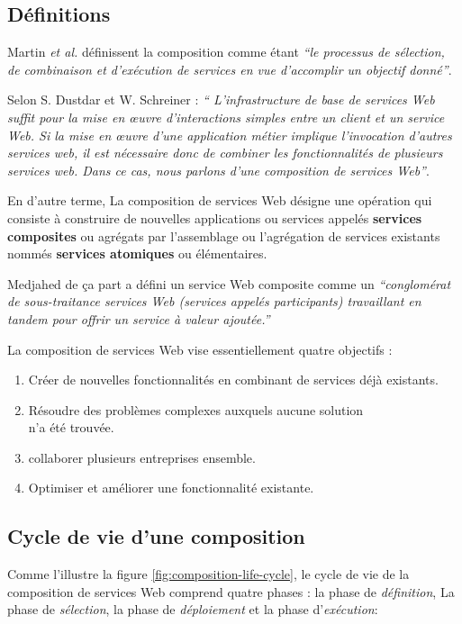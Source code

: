   \subsection{Définitions}
  \label{sec:definitions}
  Martin \emph{et al.} \cite{martin2004owl} définissent la composition
  comme étant \emph{``le processus de sélection, de combinaison et
    d'exécution de services en vue d'accomplir un objectif
    donné''}.\bigskip

  Selon S. Dustdar et W. Schreiner \cite{dustdar2005survey} : \emph{``
    L'infrastructure de base de services Web suffit pour la mise en
    œuvre d'interactions simples entre un client et un service Web. Si
    la mise en œuvre d'une application métier implique l'invocation
    d'autres services web, il est nécessaire donc de combiner les
    fonctionnalités de plusieurs services web. Dans ce cas, nous
    parlons d'une composition de services Web''}.\bigskip

  En d'autre terme, La composition de services Web désigne une
  opération qui consiste à construire de nouvelles applications ou
  services appelés \textbf{services composites} ou agrégats par
  l'assemblage ou l'agrégation de services existants nommés
  \textbf{services atomiques} ou élémentaires.\bigskip

  Medjahed \cite{medjahed2004thesis}de ça part a défini un service Web
  composite comme un \emph{``conglomérat de sous-traitance services
    Web (services appelés participants) travaillant en tandem pour
    offrir un service à valeur ajoutée.''}\bigskip

  La composition de services Web vise essentiellement quatre objectifs
  \cite{driss2011approche}:

  \begin{enumerate}
  \item Créer de nouvelles fonctionnalités en combinant de services
    déjà existants.
  \item Résoudre des problèmes complexes auxquels aucune solution\\
    n'a été trouvée.
  \item collaborer plusieurs entreprises ensemble.
  \item Optimiser et améliorer une fonctionnalité existante.
  \end{enumerate}

  \subsection{Cycle de vie d'une composition }
  \label{sec:cycle-de-vie}
  Comme l'illustre la figure \ref{fig:composition-life-cycle}, le
  cycle de vie de la composition de services Web comprend quatre
  phases \cite{sheng2014web}: la phase de \textit{définition}, La
  phase de \textit{sélection}, la phase de \textit{déploiement} et la
  phase d'\textit{exécution}:

